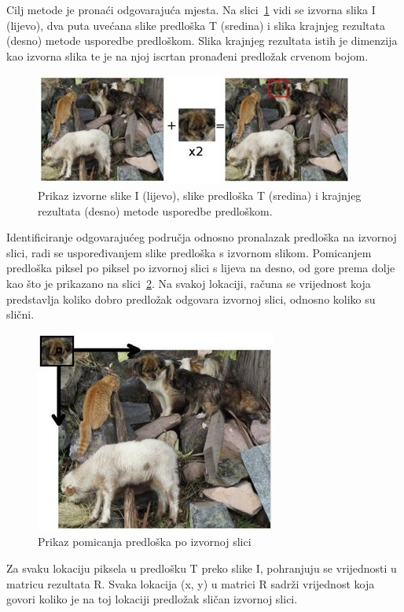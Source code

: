 Cilj metode je pronaći odgovarajuća mjesta. Na
slici~\ref{fig:tm1.jpg} vidi se izvorna slika I (lijevo), dva puta uvećana slike predloška T (sredina)
i slika krajnjeg rezultata (desno) metode usporedbe predloškom.
Slika krajnjeg rezultata istih je dimenzija kao izvorna slika te 
je na njoj iscrtan pronađeni predložak crvenom bojom.

\begin{figure}[h]
\centering
\includegraphics[scale=1]{figures/tm1.jpg}
\caption{Prikaz izvorne slike I (lijevo), slike predloška T (sredina) i krajnjeg rezultata (desno)
metode usporedbe predloškom.}
\label{fig:tm1.jpg}
\end{figure}

Identificiranje odgovarajućeg područja odnosno pronalazak predloška na izvornoj slici, radi se uspoređivanjem slike
predloška s izvornom slikom. Pomicanjem predloška piksel po piksel po
izvornoj slici s lijeva na desno, od gore prema dolje kao što je
prikazano na slici~\ref{fig:tm2.jpg}. Na svakoj lokaciji, računa se
vrijednost koja predstavlja koliko dobro predložak odgovara izvornoj
slici, odnosno koliko su slični. 

\begin{figure}[h]
\centering
\includegraphics[scale=0.5]{figures/tm2.jpg}
\caption{Prikaz pomicanja predloška po izvornoj slici}
\label{fig:tm2.jpg}
\end{figure}

Za svaku lokaciju piksela u predlošku T preko slike I, pohranjuju se
vrijednosti u matricu rezultata R. Svaka lokacija (x, y) u matrici R
sadrži vrijednost koja govori koliko je na toj lokaciji predložak
sličan izvornoj slici. 

